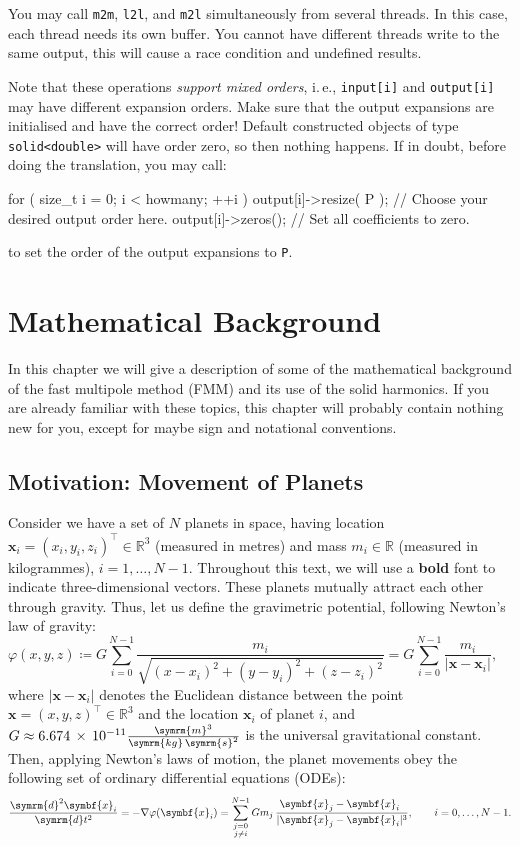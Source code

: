 \documentclass{scrbook}
\newcommand{\reals}{\ensuremath{\mathbb{R}}}
\newcommand{\wholespace}{\ensuremath{\reals^3}}
\newcommand{\vv}[1]{\ensuremath{\symbf{#1}}} %
\newcommand{\dd}{\ensuremath{\symrm{d}}}     %
\begin{document}
You may call \lstinline|m2m|, \lstinline|l2l|, and \lstinline|m2l|
simultaneously from several threads. In this case, each thread needs its own
buffer. You cannot have different threads  write to the same output, this will
cause a race condition and undefined results.

Note that these operations \emph{support mixed orders}, i.\,e.,
\lstinline|input[i]| and \lstinline|output[i]| may have different expansion
orders. Make sure that the output expansions are initialised and have the
correct order! Default constructed objects of type \lstinline|solid<double>|
will have order zero, so then nothing happens. If in doubt, before doing the
translation, you may call:
\begin{cppcode*}
for ( size_t i = 0; i < howmany; ++i )
{
    output[i]->resize( P ); // Choose your desired output order here.
    output[i]->zeros();     // Set all coefficients to zero.
}
\end{cppcode*}
to set the order of the output expansions to \lstinline|P|.


\chapter{Mathematical Background}\label{chp:mathbackground}
In this chapter we will give a description of some of the mathematical
background of the fast multipole method (FMM) and its use of the solid
harmonics. If you are already familiar with these topics, this chapter will
probably contain nothing new for you, except for maybe sign and notational
conventions.

\section{Motivation: Movement of Planets}
Consider we have a set of $N$ planets in space, having location
$\vv{x}_i = (x_i,y_i,z_i)^\top\in\wholespace$ (measured in metres) and mass
$m_i\in\reals$ (measured in kilogrammes), $i=1,\dotsc,N-1$. Throughout this
text, we will use a \textbf{bold} font to indicate three-dimensional vectors.
These planets mutually attract each other through gravity. Thus, let us define
the gravimetric potential, following Newton's law of gravity:
\begin{equation}\label{eqn:gravimetric-potential}
\varphi(x,y,z)\coloneqq
G\sum_{i=0}^{N-1}\frac{m_i}{\sqrt{(x-x_i)^2 + 
(y-y_i)^2 + (z-z_i)^2}} = 
G\sum_{i=0}^{N-1}\frac{m_i}{|\vv{x}-\vv{x}_i|},
\qquad
\end{equation}
where $|\vv{x}-\vv{x}_i|$ denotes the Euclidean distance between the point
$\vv{x}=(x,y,z)^\top\in\wholespace$ and the location $\vv{x}_i$ of planet $i$,
and $G\approx6.674\,\times\,10^{-11}\frac{\symrm{m}^3}{\symrm{kg}\,\symrm{s}^2}$
is the universal gravitational constant. Then, applying Newton's laws of
motion, the planet movements obey the following set of ordinary differential
equations (ODEs):
\begin{equation}
\frac{\dd^2\vv{x}_i}{\dd t^2} = -\nabla\varphi(\vv{x}_i) =
\sum_{\substack{j=0\\j\neq i}}^{N-1}
Gm_j\,\frac{\phantom{|}\vv{x}_j-\vv{x}_i\phantom{|^3}}{|\vv{x}_j-\vv{x}_i|^3},
\qquad i = 0,\dotsc,N-1.
\end{equation}
\end{document}
